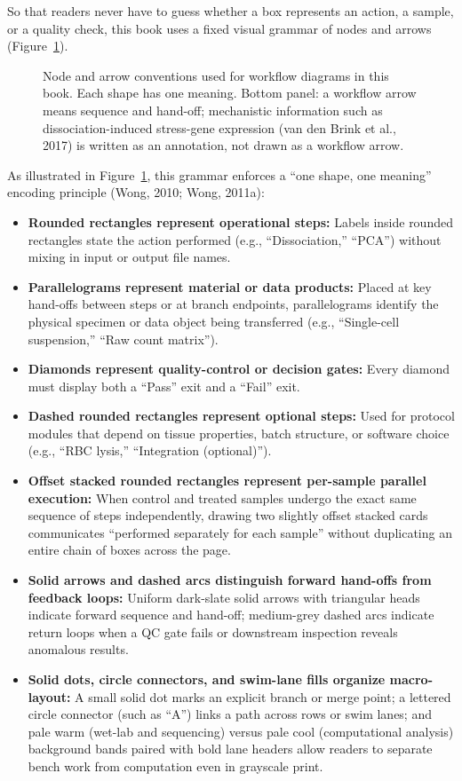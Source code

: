 So that readers never have to guess whether a box represents an action, a sample, or a quality check, this book uses a fixed visual grammar of nodes and arrows (Figure~\ref{fig:ch06-02}).

\begin{figure}[htbp]\centering
\resizebox{0.94\linewidth}{!}{}
\caption{Node and arrow conventions used for workflow diagrams in this book. Each shape has one meaning. Bottom panel: a workflow arrow means sequence and hand-off; mechanistic information such as dissociation-induced stress-gene expression (van den Brink et al., 2017) is written as an annotation, not drawn as a workflow arrow.}\label{fig:ch06-02}
\end{figure}

As illustrated in Figure~\ref{fig:ch06-02}, this grammar enforces a ``one shape, one meaning'' encoding principle (Wong, 2010; Wong, 2011a):
\begin{itemize}
\item \textbf{Rounded rectangles represent operational steps:} Labels inside rounded rectangles state the action performed (e.g., ``Dissociation,'' ``PCA'') without mixing in input or output file names.
\item \textbf{Parallelograms represent material or data products:} Placed at key hand-offs between steps or at branch endpoints, parallelograms identify the physical specimen or data object being transferred (e.g., ``Single-cell suspension,'' ``Raw count matrix'').
\item \textbf{Diamonds represent quality-control or decision gates:} Every diamond must display both a ``Pass'' exit and a ``Fail'' exit.
\item \textbf{Dashed rounded rectangles represent optional steps:} Used for protocol modules that depend on tissue properties, batch structure, or software choice (e.g., ``RBC lysis,'' ``Integration (optional)'').
\item \textbf{Offset stacked rounded rectangles represent per-sample parallel execution:} When control and treated samples undergo the exact same sequence of steps independently, drawing two slightly offset stacked cards communicates ``performed separately for each sample'' without duplicating an entire chain of boxes across the page.
\item \textbf{Solid arrows and dashed arcs distinguish forward hand-offs from feedback loops:} Uniform dark-slate solid arrows with triangular heads indicate forward sequence and hand-off; medium-grey dashed arcs indicate return loops when a QC gate fails or downstream inspection reveals anomalous results.
\item \textbf{Solid dots, circle connectors, and swim-lane fills organize macro-layout:} A small solid dot marks an explicit branch or merge point; a lettered circle connector (such as ``A'') links a path across rows or swim lanes; and pale warm (wet-lab and sequencing) versus pale cool (computational analysis) background bands paired with bold lane headers allow readers to separate bench work from computation even in grayscale print.
\end{itemize}

